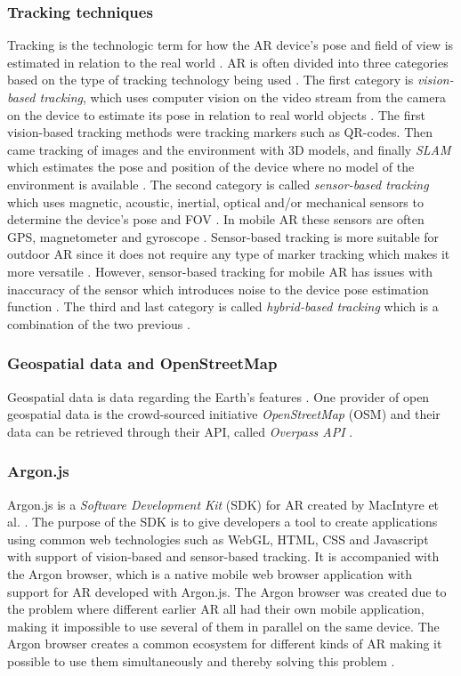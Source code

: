 \subsubsection{Tracking techniques}
Tracking is the technologic term for how the AR device's pose and field of view is estimated in relation to the real world \cite{zhou2008trends}. AR is often divided into three categories based on the type of tracking technology being used \cite{zhou2008trends}. The first category is \textit{vision-based tracking}, which uses computer vision on the video stream from the camera on the device to estimate its pose in relation to real world objects \cite{zhou2008trends}. The first vision-based tracking methods were tracking markers such as QR-codes. Then came tracking of images and the environment with 3D models, and finally \textit{SLAM} which estimates the pose and position of the device where no model of the environment is available \cite{azuma2016most}. The second category is called \textit{sensor-based tracking} which uses magnetic, acoustic, inertial, optical and/or mechanical sensors to determine the device's pose and FOV \cite{zhou2008trends}. In mobile AR these sensors are often GPS, magnetometer and gyroscope \cite{zhou2008trends}. Sensor-based tracking is more suitable for outdoor AR since it does not require any type of marker tracking which makes it more versatile \cite{cirulis20133d}. However, sensor-based tracking for mobile AR has issues with inaccuracy of the sensor which introduces noise to the device pose estimation function \cite{cirulis20133d}. The third and last category is called \textit{hybrid-based tracking} which is a combination of the two previous \cite{zhou2008trends}. 

\subsubsection{Geospatial data and OpenStreetMap}
Geospatial data is data regarding the Earth's features \cite{ogcFaq}. One provider of open geospatial data is the crowd-sourced initiative \textit{OpenStreetMap} (OSM) \cite{osmAbout} and their data can be retrieved through their API, called \textit{Overpass API} \cite{osmOverpass}.

\subsubsection{Argon.js}
Argon.js is a \textit{Software Development Kit} (SDK) for AR created by MacIntyre et al. \cite{macintyre2011argon}. The purpose of the SDK is to give developers a tool to create applications using common web technologies such as WebGL, HTML, CSS and Javascript with support of vision-based and sensor-based tracking. It is accompanied with the Argon browser, which is a native mobile web browser application with support for AR developed with Argon.js. The Argon browser was created due to the problem where different earlier AR all had their own mobile application, making it impossible to use several of them in parallel on the same device. The Argon browser creates a common ecosystem for different kinds of AR making it possible to use them simultaneously and thereby solving this problem \cite{macintyre2011argon}. 

